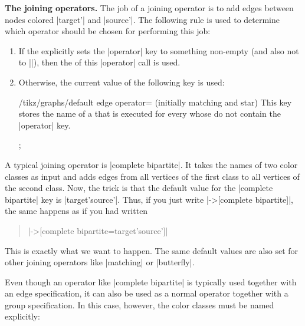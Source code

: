 \medskip
\textbf{The joining operators.} The job of a joining operator is to add edges
between nodes colored |target'| and |source'|. The following rule is used to
determine which operator should be chosen for performing this job:
%
\begin{enumerate}
    \item If the  explicitly sets the |operator| key
        to something non-empty (and also not to |\relax|), then the 
        of this |operator| call is used.
    \item Otherwise, the current value of the following key is used:
        \begin{key}{/tikz/graphs/default edge operator= (initially matching and star)}
            This key stores the name of a  that is executed for every
             whose  do not contain the
            |operator| key.
\begin{codeexample}[preamble={\usetikzlibrary{graphs}}]
\tikz {};
\end{codeexample}
        \end{key}
\end{enumerate}

A typical joining operator is |complete bipartite|. It takes the names of two
color classes as input and adds edges from all vertices of the first class to
all vertices of the second class. Now, the trick is that the default value for
the |complete bipartite| key is |{target'}{source'}|. Thus, if you just write
|->[complete bipartite]|, the same happens as if you had written
%
\begin{quote}
    |->[complete bipartite={target'}{source'}]|
\end{quote}
%
This is exactly what we want to happen. The same default values are also set
for other joining operators like |matching| or |butterfly|.

Even though an operator like |complete bipartite| is typically used together
with an edge specification, it can also be used as a normal operator together
with a group specification. In this case, however, the color classes must be
named explicitly:
%
\begin{codeexample}[preamble={\usetikzlibrary{graphs}}]
\end{codeexample}

